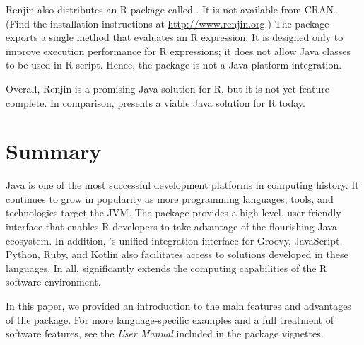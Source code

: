 Renjin also distributes an R package called . It is not available from CRAN. (Find the installation instructions at \url{http://www.renjin.org}.) The  package exports a single method that evaluates an R expression. It is designed only to improve execution performance for R expressions; it does not allow Java classes to be used in R script. Hence, the  package is not a Java platform integration.

Overall, Renjin is a promising Java solution for R, but it is not yet feature-complete. In comparison,  presents a viable Java solution for R today.

\section{Summary}

Java is one of the most successful development platforms in computing history. It continues to grow in popularity as more programming languages, tools, and technologies target the JVM. The  package provides a high-level, user-friendly interface that enables R developers to take advantage of the flourishing Java ecosystem. In addition, 's unified integration interface for Groovy, JavaScript, Python, Ruby, and Kotlin also facilitates access to solutions developed in these languages. In all,  significantly extends the computing capabilities of the R software environment.

In this paper, we provided an introduction to the main features and advantages of the  package. For more language-specific examples and a full treatment of software features, see the \textit{ User Manual} included in the package vignettes.



\address{Floid R. Gilbert\\
    Master's Student\\
    Department of Statistics\\
    Brigham Young University\\
    Provo, UT 84602\\
    USA\\}

\address{David B. Dahl\\
    Professor, Graduate Coordinator, and Associate Chair\\
    Department of Statistics\\
    Brigham Young University\\
    Provo, UT 84602\\
    USA\\}

